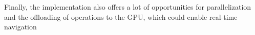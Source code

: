 Finally, the implementation also offers a lot of opportunities for parallelization and the offloading of operations to the GPU, which could enable real-time navigation 


